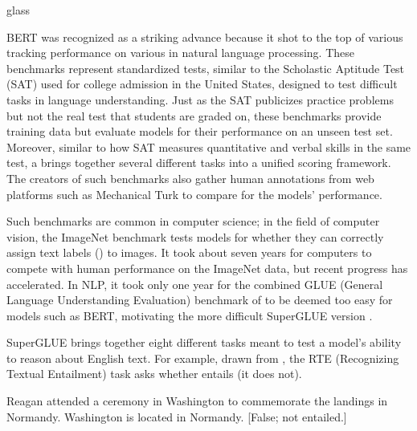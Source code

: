 % 

\begin{tblsfilledsymbol}{}{glass}
\begin{underthehood}

BERT was recognized as a striking advance because it shot to the top of various  tracking performance on various  in natural language processing.  These benchmarks represent standardized tests, similar to the Scholastic Aptitude Test (SAT) used for college admission in the United States,  designed to test difficult tasks in language understanding.  Just as the SAT publicizes practice problems but not the real test that students are graded on, these benchmarks provide training data but evaluate models for their performance on an unseen test set.  Moreover, similar to how SAT measures quantitative and verbal skills in the same test, a  brings together several different tasks into a unified scoring framework.  The creators of such benchmarks also gather human annotations from web platforms such as Mechanical Turk to compare for the models' performance.

Such benchmarks are common in computer science; in the field of computer vision, the ImageNet benchmark \citep{Deng-etal:2009} tests models for whether they can correctly assign text labels () to images.  It took about seven years for computers to compete with human performance on the ImageNet data, but recent progress has accelerated.  In NLP, it took only one year for the combined GLUE (General Language Understanding Evaluation) benchmark of \citet{Wang-etal:2018} to be deemed too easy for models such as BERT, motivating the more difficult SuperGLUE version \citep{Wang-etal:2019}.  

SuperGLUE brings together eight different tasks meant to test a model's ability to reason about English text.  For example, drawn from \citet{Dagan-etal:2005}, the RTE (Recognizing Textual Entailment) task asks whether  entails  (it does not).  


\ea \label{rte} \ea \label{reagan} Reagan attended a ceremony in Washington to commemorate the landings in Normandy. 
    \ex \label{normandy} Washington is located in Normandy. [False; not entailed.]
    \z
    \z 



\end{underthehood}
\end{tblsfilledsymbol}
